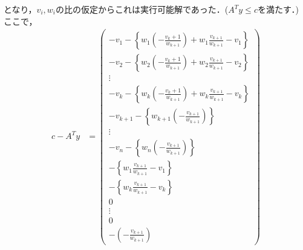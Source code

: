 \documentclass[a4j,uplatex]{jsarticle}
\theoremstyle{definition}
\begin{document}
となり，$v_i,w_i$の比の仮定からこれは実行可能解であった．($A^Ty\leq c$を満たす．)
ここで，
\begin{align*}
    c-A^Ty & =\begin{pmatrix}
                  -v_1-\left\{w_1(-\frac{v_k+1}{w_{k+1}})+w_1\frac{v_{k+1}}{w_{k+1}}-v_1\right\} \\
                  -v_2-\left\{w_2(-\frac{v_k+1}{w_{k+1}})+w_2\frac{v_{k+1}}{w_{k+1}}-v_2\right\} \\
                  \vdots                                                                         \\
                  -v_k-\left\{w_k(-\frac{v_k+1}{w_{k+1}})+w_k\frac{v_{k+1}}{w_{k+1}}-v_k\right\} \\
                  -v_{k+1}-\left\{w_{k+1}(-\frac{v_{k+1}}{w_{k+1}})\right\}                      \\
                  \vdots                                                                         \\
                  -v_n-\left\{w_n(-\frac{v_{k+1}}{w_{k+1}})\right\}                              \\
                  -\left\{w_1\frac{v_{k+1}}{w_{k+1}}-v_1\right\}                                 \\
                  -\left\{w_k\frac{v_{k+1}}{w_{k+1}}-v_k\right\}                                 \\
                  0                                                                              \\
                  \vdots                                                                         \\
                  0                                                                              \\
                  -\left(-\frac{v_{k+1}}{w_{k+1}}\right)
              \end{pmatrix} \\
\end{align*}
\end{document}
